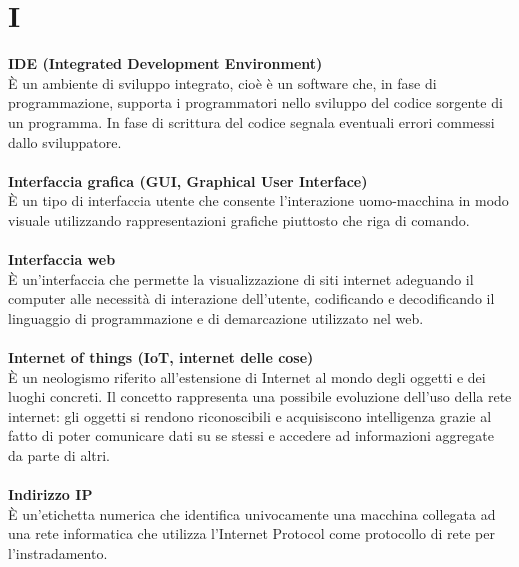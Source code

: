 \section{I}
\textbf{IDE (Integrated Development Environment)}\\
È un ambiente di sviluppo integrato, cioè è un software che, in fase di programmazione, supporta i programmatori nello sviluppo del codice sorgente di un programma. In fase di scrittura del codice segnala eventuali errori commessi dallo sviluppatore. \\ \\
\textbf{Interfaccia grafica (GUI, Graphical User Interface)}\\
È un tipo di interfaccia utente che consente l'interazione uomo-macchina in modo visuale utilizzando rappresentazioni grafiche piuttosto che riga di comando. \\ \\
\textbf{Interfaccia web}\\
È un'interfaccia che permette la visualizzazione di siti internet adeguando il computer alle necessità di interazione dell'utente, codificando e decodificando il linguaggio di programmazione e di demarcazione utilizzato nel web. \\ \\
\textbf{Internet of things (IoT, internet delle cose)}\\
È un neologismo riferito all'estensione di Internet al mondo degli oggetti e dei luoghi concreti. Il concetto rappresenta una possibile evoluzione dell'uso della rete internet: gli oggetti si rendono riconoscibili e acquisiscono intelligenza grazie al fatto di poter comunicare dati su se stessi e accedere ad informazioni aggregate da parte di altri. \\ \\
\textbf{Indirizzo IP}\\
È un'etichetta numerica che identifica univocamente una macchina collegata ad una rete informatica che utilizza l'Internet Protocol come protocollo di rete per l'instradamento.
\clearpage
